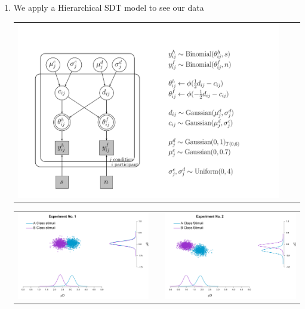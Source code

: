 \documentclass[final]{beamer}
\newlength{\onecolwid}
\newlength{\twocolwid}
\begin{document}
\begin{frame}[t]
\begin{columns}[t]
\begin{column}{\twocolwid}
\setlength{\onecolwid}{0.24\paperwidth}
\begin{columns}[t,totalwidth=\twocolwid] %
\begin{column}{\onecolwid}\vspace{-.6in} %


\begin{alertblock}{}

\begin{enumerate}
\item We apply a Hierarchical SDT model to see our data
\begin{center}
\begin{tabular}{ccc}
\includegraphics[width=0.65\linewidth]{Figures/0_HierarchicalSDT.pdf}
\end{tabular}
\end{center}

\begin{center}
\begin{tabular}{ccc}
\includegraphics[width=0.47\linewidth]{Figures/0-Exp1.pdf} & \hfill & \includegraphics[width=0.47\linewidth]{Figures/0-Exp2.pdf}
\end{tabular}
\end{center}


\end{enumerate}
\end{alertblock}
\end{column}
\end{columns}
\end{column}
\end{columns}
\end{frame}
\end{document}
